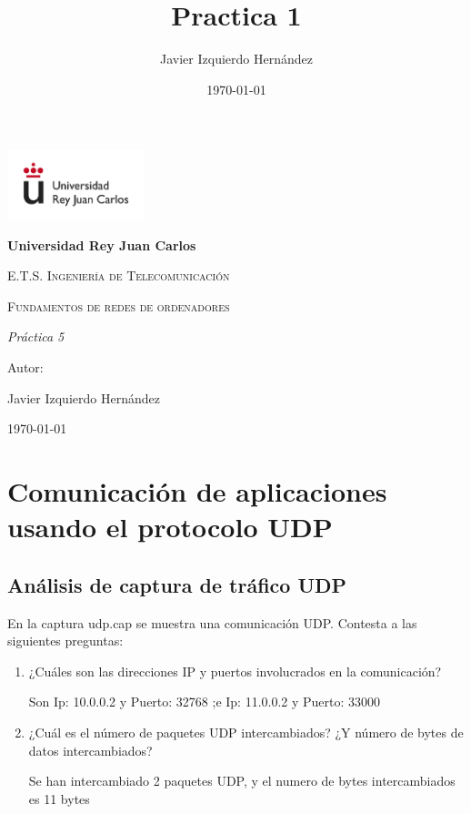 \documentclass[12pt, a4paper]{report}
\title{Practica 1}
\author{Javier Izquierdo Hernández}
\date{\today}
\begin{document}
	\begin{titlepage}
		\centering
		{\includegraphics[width=0.3\textwidth]{logo}\par}
		\vspace{1cm}
		{\bfseries\LARGE Universidad Rey Juan Carlos \par}
		\vspace{1cm}
		{\scshape\Large E.T.S. Ingeniería de Telecomunicación \par}
		\vspace{3cm}
		{\scshape\Huge Fundamentos de redes de ordenadores \par}
		\vspace{3cm}
		{\itshape\Large Práctica 5 \par}
		\vfill
		{\Large Autor: \par}
		{\Large Javier Izquierdo Hernández \par}
		\vfill
		{\Large \today \par}
	\end{titlepage}

\newpage
\renewcommand{\contentsname}{Contenidos}
\tableofcontents
\newpage

\chapter{Comunicación de aplicaciones usando el protocolo UDP}
\section{Análisis de captura de tráfico UDP}
En la captura udp.cap se muestra una comunicación UDP. Contesta a las siguientes preguntas:

\begin{enumerate}
	\item ¿Cuáles son las direcciones IP y puertos involucrados en la comunicación?
	
	Son Ip: 10.0.0.2 y Puerto: 32768 ;e Ip: 11.0.0.2 y Puerto: 33000
	
	\item ¿Cuál es el número de paquetes UDP intercambiados? ¿Y número de bytes de datos intercambiados?
	
	Se han intercambiado 2 paquetes UDP, y el numero de bytes intercambiados es 11 bytes
	
\end{enumerate}
\end{document}
